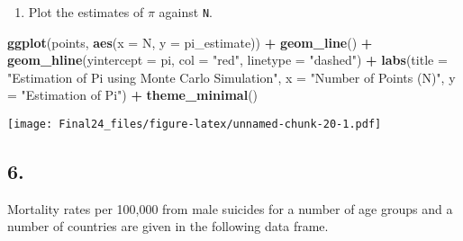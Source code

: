 \documentclass[
]{article}
\newenvironment{Shaded}{\begin{snugshade}}{\end{snugshade}}
\newcommand{\AttributeTok}[1]{\textcolor[rgb]{0.13,0.29,0.53}{#1}}
\newcommand{\FunctionTok}[1]{\textcolor[rgb]{0.13,0.29,0.53}{\textbf{#1}}}
\newcommand{\NormalTok}[1]{#1}
\newcommand{\SpecialCharTok}[1]{\textcolor[rgb]{0.81,0.36,0.00}{\textbf{#1}}}
\newcommand{\StringTok}[1]{\textcolor[rgb]{0.31,0.60,0.02}{#1}}
\providecommand{\tightlist}{%
  \setlength{\itemsep}{0pt}\setlength{\parskip}{0pt}}
\begin{document}
\begin{enumerate}
\def\labelenumi{\alph{enumi}.}
\setcounter{enumi}{1}
\tightlist
\item
  Plot the estimates of \(\pi\) against \texttt{N}.
\end{enumerate}

\begin{Shaded}
\begin{Highlighting}[]
\FunctionTok{ggplot}\NormalTok{(points, }\FunctionTok{aes}\NormalTok{(}\AttributeTok{x =}\NormalTok{ N, }\AttributeTok{y =}\NormalTok{ pi\_estimate)) }\SpecialCharTok{+}
  \FunctionTok{geom\_line}\NormalTok{() }\SpecialCharTok{+}
  \FunctionTok{geom\_hline}\NormalTok{(}\AttributeTok{yintercept =}\NormalTok{ pi, }\AttributeTok{col =} \StringTok{"red"}\NormalTok{, }\AttributeTok{linetype =} \StringTok{"dashed"}\NormalTok{) }\SpecialCharTok{+}
  \FunctionTok{labs}\NormalTok{(}\AttributeTok{title =} \StringTok{"Estimation of Pi using Monte Carlo Simulation"}\NormalTok{,}
       \AttributeTok{x =} \StringTok{"Number of Points (N)"}\NormalTok{,}
       \AttributeTok{y =} \StringTok{"Estimation of Pi"}\NormalTok{) }\SpecialCharTok{+}
  \FunctionTok{theme\_minimal}\NormalTok{()}
\end{Highlighting}
\end{Shaded}

\texttt{[image: Final24\_files/figure-latex/unnamed-chunk-20-1.pdf]}

\subsection{6.}\label{section-5}

Mortality rates per 100,000 from male suicides for a number of age
groups and a number of countries are given in the following data frame.
\end{document}

